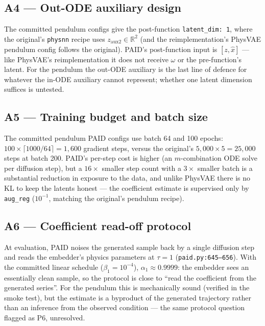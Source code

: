 \documentclass[11pt,a4paper]{article}
\newcommand{\code}[1]{\texttt{#1}}
\begin{document}
\subsection*{A4 --- Out-ODE auxiliary design}

The committed pendulum configs give the post-function \code{latent\_dim: 1},
where the original's \code{physnn} recipe uses $z_{\mathrm{aux2}} \in
\mathbb{R}^2$ (and the reimplementation's PhysVAE pendulum config follows the
original). PAID's post-function input is $[z, \hat{x}]$ --- like PhysVAE's
reimplementation it does not receive $\omega$ or the pre-function's latent.
For the pendulum the out-ODE auxiliary is the last line of defence for
whatever the in-ODE auxiliary cannot represent; whether one latent dimension
suffices is untested.

\subsection*{A5 --- Training budget and batch size}

The committed pendulum PAID configs use batch 64 and 100 epochs: $100 \times
\lceil 1000/64 \rceil = 1{,}600$ gradient steps, versus the original's
$5{,}000 \times 5 = 25{,}000$ steps at batch 200. PAID's per-step cost is
higher (an $m$-combination ODE solve per diffusion step), but a $16\times$
smaller step count with a $3\times$ smaller batch is a substantial reduction
in exposure to the data, and unlike PhysVAE there is no KL to keep the
latents honest --- the coefficient estimate is supervised only by
\code{aug\_reg} ($10^{-1}$, matching the original's pendulum recipe).

\subsection*{A6 --- Coefficient read-off protocol}

At evaluation, PAID noises the generated sample back by a single diffusion
step and reads the embedder's physics parameters at $\tau = 1$
(\code{paid.py:645--656}). With the committed linear schedule
($\beta_1 = 10^{-4}$), $\alpha_1 \approx 0.9999$: the embedder sees an
essentially clean sample, so the protocol is close to ``read the coefficient
from the generated series''. For the pendulum this is mechanically sound
(verified in the smoke test), but the estimate is a byproduct of the
generated trajectory rather than an inference from the observed condition ---
the same protocol question flagged as P6, unresolved.
\end{document}
